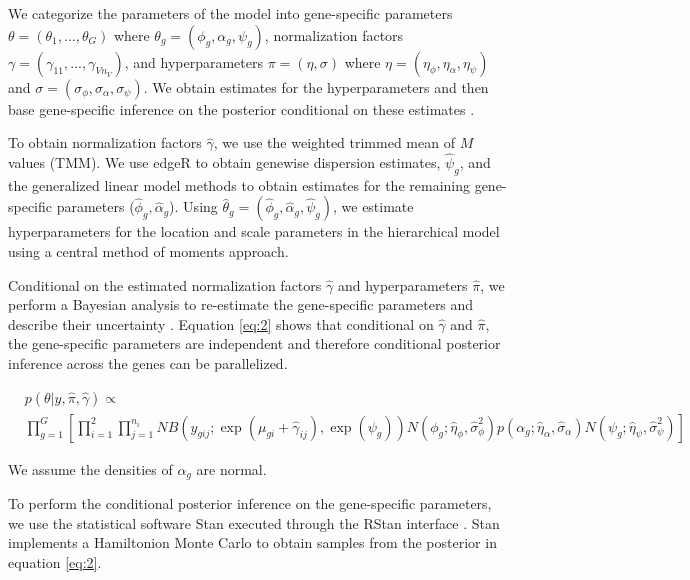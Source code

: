 \documentclass[11pt]{isuthesis}
\begin{document}
We categorize the parameters of the model into gene-specific parameters $\theta = (\theta_1, ..., \theta_G)$ where $\theta_g = (\phi_g, \alpha_g, \psi_g)$, normalization factors $\gamma = (\gamma_{11}, ..., \gamma_{V n_V})$, and hyperparameters $\pi = (\eta, \sigma)$ where $\eta = (\eta_\phi, \eta_\alpha, \eta_\psi)$ and $\sigma = (\sigma_\phi, \sigma_\alpha, \sigma_\psi)$. We obtain estimates for the hyperparameters and then base gene-specific inference on the posterior conditional on these estimates \citep{niemi2015empirical}.

To obtain normalization factors $\hat{\gamma}$, we use the weighted trimmed mean of $M$ values (TMM). We use edgeR to obtain genewise dispersion estimates, $\hat{\psi}_g$, and the generalized linear model methods to obtain estimates for the remaining gene-specific parameters ($\hat{\phi}_g, \hat{\alpha}_g$)\citep{robinson2010scaling}. Using $\hat{\theta}_g = (\hat{\phi}_g , \hat{\alpha}_g, \hat{\psi}_g)$, we estimate hyperparameters for the location and scale parameters in the hierarchical model using a central method of moments approach. 

Conditional on the estimated normalization factors $\hat{\gamma}$ and hyperparameters $\hat{\pi}$, we perform a Bayesian analysis to re-estimate the gene-specific parameters and describe their uncertainty \citep{niemi2015empirical}. Equation \ref{eq:2} shows that conditional on $\hat{\gamma}$ and $\hat{\pi}$, the gene-specific parameters are independent and therefore conditional posterior inference across the genes can be parallelized. 

\begin{equation}
\label{eq:2}
\begin{split}
& p(\theta | y, \hat{\pi}, \hat{\gamma})  \propto \\ & \prod_{g=1}^{G} \left[ \prod_{i=1}^{2} \prod_{j=1}^{n_i} NB(y_{gij} ; \exp(\mu_{gi} + \hat{\gamma}_{ij}), \exp(\psi_g)) N(\phi_g ; \hat{\eta}_{\phi}, \hat{\sigma}^2_{\phi}) p(\alpha_g ; \hat{\eta}_{\alpha}, \hat{\sigma}_{\alpha}) N(\psi_g ; \hat{\eta}_{\psi}, \hat{\sigma}^2_{\psi})  \right]
\end{split}
\end{equation}

We assume the densities of $\alpha_g$ are normal.

To perform the conditional posterior inference on the gene-specific parameters, we use the statistical software Stan \citep{stan2014stan} executed through the RStan interface \citep{team2016rstan}. Stan implements a Hamiltonion Monte Carlo \citep{neal2011mcmc} to obtain samples from the posterior in equation \ref{eq:2}. 
\end{document}
